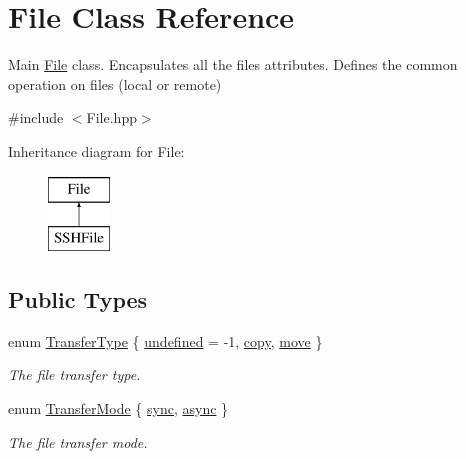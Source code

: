 \hypertarget{classFile}{
\section{File Class Reference}
\label{classFile}
}


Main \hyperlink{classFile}{File} class. Encapsulates all the files attributes. Defines the common operation on files (local or remote)  




{\ttfamily \#include $<$File.hpp$>$}

Inheritance diagram for File:\begin{figure}[H]
\begin{center}
\leavevmode
\includegraphics[height=2.000000cm]{classFile}
\end{center}
\end{figure}
\subsection*{Public Types}
\begin{DoxyCompactItemize}
\item 
enum \hyperlink{classFile_a6b5e0e4ca04b9983349e02866ff1c659}{TransferType} \{ \hyperlink{classFile_a6b5e0e4ca04b9983349e02866ff1c659a9269c2b4253efd45676b11ad9e963d38}{undefined} = -\/1, 
\hyperlink{classFile_a6b5e0e4ca04b9983349e02866ff1c659a82cfd632fe096ab570cd8f64b69e4df5}{copy}, 
\hyperlink{classFile_a6b5e0e4ca04b9983349e02866ff1c659a00895022294873a8ad0b1030e2b5d1ea}{move}
 \}
\begin{DoxyCompactList}\small\item\em The file transfer type. \item\end{DoxyCompactList}\item 
enum \hyperlink{classFile_a4295512b0ee27752fb5ee313155499cc}{TransferMode} \{ \hyperlink{classFile_a4295512b0ee27752fb5ee313155499cca8c6ef20805ae2b316a75d1e6921c01b8}{sync}, 
\hyperlink{classFile_a4295512b0ee27752fb5ee313155499ccaad05772127fa058068c3ec4574cbd180}{async}
 \}
\begin{DoxyCompactList}\small\item\em The file transfer mode. \item\end{DoxyCompactList}\end{DoxyCompactItemize}
